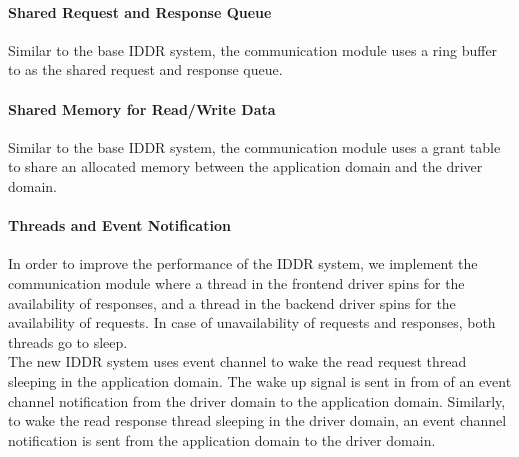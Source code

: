 \paragraph{Shared Request and Response Queue}
Similar to the base IDDR system, the communication module uses a ring buffer to as the shared request and response queue. 

\paragraph{Shared Memory for Read/Write Data}
Similar to the base IDDR system, the communication module uses a grant table to share an allocated memory between the application domain and the driver domain. 

\paragraph{Threads and Event Notification}
In order to improve the performance of the IDDR system, we implement the communication module where a thread in the frontend driver spins for the availability of responses, and a thread in the backend driver spins for the availability of requests. In case of unavailability of requests and responses, both threads go to sleep. 
\\[3mm] 
The new IDDR system uses event channel to wake the read request thread sleeping in the application domain. The wake up signal is sent in from of an event channel notification from the driver domain to the application domain. Similarly, to wake the read response thread sleeping in the driver domain, an event channel notification is sent from the application domain to the driver domain.

